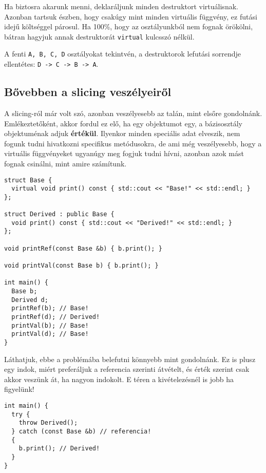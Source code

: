 \documentclass[../cpp_book/cpp_book.tex]{subfiles}
\begin{document}
	\medskip
	Ha biztosra akarunk menni, deklaráljunk minden destruktort virtuálisnak. Azonban tartsuk észben, hogy csakúgy mint minden virtuális függvény, ez futási idejű költséggel párosul. Ha 100\%, hogy az osztályunkból nem fognak örökölni, bátran hagyjuk annak destruktorát \texttt{virtual} kulcsszó nélkül.
	
	\medskip
	A fenti \texttt{A, B, C, D} osztályokat tekintvén, a destruktorok lefutási sorrendje ellentétes:  \texttt{D -> C -> B -> A}.
	\subsection{Bővebben a slicing veszélyeiről}
	A slicing-ról már volt szó, azonban veszélyesebb az talán, mint elsőre gondolnánk. Emlékeztetőként, akkor fordul ez elő, ha egy objektumot egy, a bázisosztály objektuménak adjuk \textbf{értékül}. Ilyenkor minden speciális adat elveszik, nem fogunk tudni hivatkozni specifikus metódusokra, de ami még veszélyesebb, hogy a virtuális függvényeket ugyanúgy meg fogjuk tudni hívni, azonban azok mást fognak csinálni, mint amire számítunk.
	\begin{lstlisting}
struct Base {
  virtual void print() const { std::cout << "Base!" << std::endl; }
};

struct Derived : public Base {
  void print() const { std::cout << "Derived!" << std::endl; }
};

void printRef(const Base &b) { b.print(); }

void printVal(const Base b) { b.print(); }

int main() {
  Base b;
  Derived d;
  printRef(b); // Base!
  printRef(d); // Derived!
  printVal(b); // Base!
  printVal(d); // Base!
}
	\end{lstlisting}
	Láthatjuk, ebbe a problémába belefutni könnyebb mint gondolnánk. Ez is plusz egy indok, miért preferáljuk a referencia szerinti átvételt, és érték szerint csak akkor veszünk át, ha nagyon indokolt. E téren a kivételezésnél is jobb ha figyelünk!
	\begin{lstlisting}
int main() {
  try {
    throw Derived();
  } catch (const Base &b) // referencia!
  {
    b.print(); // Derived!
  }
}
	\end{lstlisting}
\end{document}
